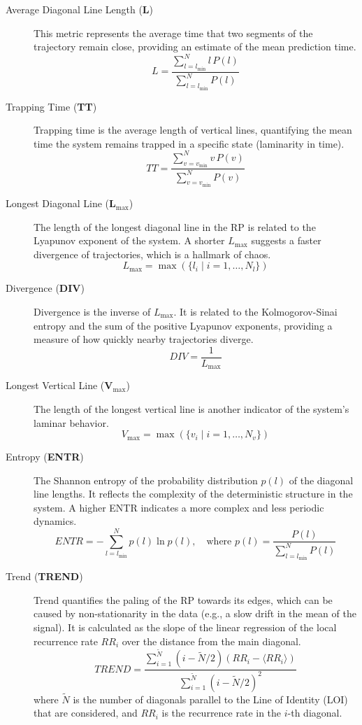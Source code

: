 \documentclass{article}
\begin{document}
\begin{description}
					\item[Average Diagonal Line Length (\textbf{L})]
					This metric represents the average time that two segments of the trajectory remain close, providing an estimate of the mean prediction time.
					\[
					L = \frac{\sum_{l=l_{\text{min}}}^{N} l \, P(l)}{\sum_{l=l_{\text{min}}}^{N} P(l)}
					\]

					\item[Trapping Time (\textbf{TT})]
					Trapping time is the average length of vertical lines, quantifying the mean time the system remains trapped in a specific state (laminarity in time).
					\[
					TT = \frac{\sum_{v=v_{\text{min}}}^{N} v \, P(v)}{\sum_{v=v_{\text{min}}}^{N} P(v)}
					\]

					\item[Longest Diagonal Line (\textbf{L$_{\text{max}}$})]
					The length of the longest diagonal line in the RP is related to the Lyapunov exponent of the system. A shorter \( L_{\text{max}} \) suggests a faster divergence of trajectories, which is a hallmark of chaos.
					\[
					L_{\text{max}} = \max(\{l_i \; | \; i=1,\ldots,N_l\})
					\]

					\item[Divergence (\textbf{DIV})]
					Divergence is the inverse of \( L_{\text{max}} \). It is related to the Kolmogorov-Sinai entropy and the sum of the positive Lyapunov exponents, providing a measure of how quickly nearby trajectories diverge.
					\[
					DIV = \frac{1}{L_{\text{max}}}
					\]

					\item[Longest Vertical Line (\textbf{V$_{\text{max}}$})]
					The length of the longest vertical line is another indicator of the system's laminar behavior.
					\[
					V_{\text{max}} = \max(\{v_i \; | \; i=1,\ldots,N_v\})
					\]

					\item[Entropy (\textbf{ENTR})]
					The Shannon entropy of the probability distribution \( p(l) \) of the diagonal line lengths. It reflects the complexity of the deterministic structure in the system. A higher ENTR indicates a more complex and less periodic dynamics.
					\[
					ENTR = - \sum_{l=l_{\text{min}}}^{N} p(l) \ln p(l), \quad \text{where } p(l) = \frac{P(l)}{\sum_{l=l_{\text{min}}}^{N} P(l)}
					\]

					\item[Trend (\textbf{TREND})]
					Trend quantifies the paling of the RP towards its edges, which can be caused by non-stationarity in the data (e.g., a slow drift in the mean of the signal). It is calculated as the slope of the linear regression of the local recurrence rate \( RR_i \) over the distance from the main diagonal.
					\[
					TREND = \frac{\sum_{i=1}^{\tilde{N}} (i - \tilde{N}/2)(RR_i - \langle RR_i \rangle)}{\sum_{i=1}^{\tilde{N}} (i - \tilde{N}/2)^2}
					\]
					where \( \tilde{N} \) is the number of diagonals parallel to the Line of Identity (LOI) that are considered, and \( RR_i \) is the recurrence rate in the \( i \)-th diagonal.

					\end{description}
\end{document}
